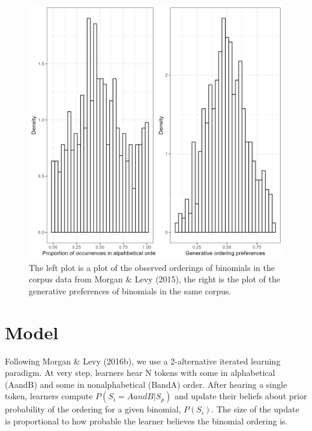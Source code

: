 \documentclass[10pt, letterpaper]{article}
\newenvironment{CodeChunk}{}{}
\begin{document}
\begin{CodeChunk}
\begin{figure}[tb]

{\centering \includegraphics[width=1\linewidth]{Figures/corpus_plots} 

}

\caption[The left plot is a plot of the observed orderings of binomials in the corpus data from Morgan \& Levy (2015), the right is the plot of the generative preferences of binomials in the same corpus]{The left plot is a plot of the observed orderings of binomials in the corpus data from Morgan \& Levy (2015), the right is the plot of the generative preferences of binomials in the same corpus.}\label{fig:corpusplot1}
\end{figure}
\end{CodeChunk}

\hypertarget{model}{%
\section{Model}\label{model}}

Following Morgan \& Levy (2016b), we use a 2-alternative iterated
learning paradigm. At very step, learners hear N tokens with some in
alphabetical (AandB) and some in nonalphabetical (BandA) order. After
hearing a single token, learners compute \(P(S_i = AandB|S_p)\) and
update their beliefs about prior probability of the ordering for a given
binomial, \(P(S_i)\). The size of the update is proportional to how
probable the learner believes the binomial ordering is.
\end{document}
